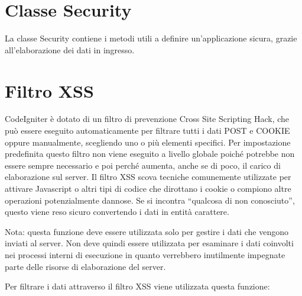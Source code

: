 \section{Classe Security}
\label{class:sicurezza}

La classe Security contiene i metodi utili a definire un'applicazione sicura, grazie all'elaborazione dei dati in ingresso.

\section*{Filtro XSS}
CodeIgniter è dotato di un filtro di prevenzione Cross Site Scripting Hack, che può essere eseguito automaticamente per filtrare tutti i dati POST e COOKIE oppure manualmente, scegliendo uno o più elementi specifici. Per impostazione predefinita questo filtro non viene eseguito a livello globale poiché potrebbe non essere sempre necessario e poi perché aumenta, anche se di poco, il carico di elaborazione sul server. Il filtro \ac{XSS} scova tecniche comunemente utilizzate per attivare Javascript o altri tipi di codice che dirottano i cookie o compiono altre operazioni potenzialmente dannose. Se si incontra ``qualcosa di non conosciuto'', questo viene reso sicuro convertendo i dati in entità carattere.

Nota: questa funzione deve essere utilizzata solo per gestire i dati che vengono inviati al server. Non deve quindi essere utilizzata per esaminare i dati coinvolti nei processi interni di esecuzione in quanto verrebbero inutilmente impegnate parte delle risorse di elaborazione del server.

Per filtrare i dati attraverso il filtro \ac{XSS} viene utilizzata questa funzione:

